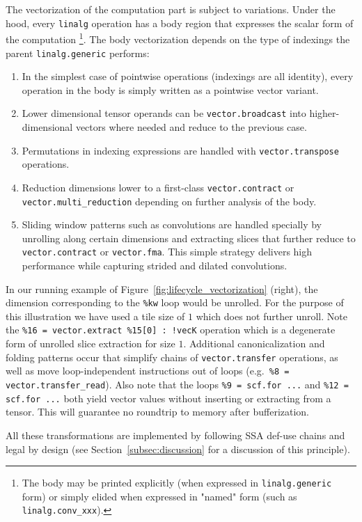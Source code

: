 The vectorization of the computation part is subject to variations.
Under the hood, every \lstinline|linalg| operation has a body region that expresses the scalar form of
the computation \footnote{The body may be printed explicitly (when expressed in \lstinline|linalg.generic| form)
or simply elided when expressed in "named" form (such as \lstinline|linalg.conv_xxx|).}.
The body vectorization depends on the type of indexings the parent \lstinline|linalg.generic| performs:
\begin{enumerate}
\item In the simplest case of pointwise operations (indexings are all identity), every operation in the body is simply written as a pointwise vector variant.
\item Lower dimensional tensor operands can be \lstinline|vector.broadcast| into higher-dimensional vectors where needed and reduce to the previous case.
\item Permutations in indexing expressions are handled with \lstinline|vector.transpose| operations.
\item Reduction dimensions lower to a first-class \lstinline{vector.contract} or \lstinline{vector.multi_reduction} depending on further analysis of the body.
\item Sliding window patterns such as convolutions are handled specially by unrolling along 
certain dimensions and extracting slices that further reduce to \lstinline{vector.contract} or
\lstinline{vector.fma}. This simple strategy delivers high performance
while capturing strided and dilated convolutions.
\end{enumerate}

In our running example of Figure~\ref{fig:lifecycle_vectorization} (right), the dimension corresponding to the \lstinline|%kw| loop would be unrolled. For the purpose of this illustration we have used a 
tile size of $1$ which does not further unroll. Note the 
\lstinline|%16 = vector.extract %15[0] : !vecK| operation which is a degenerate form of unrolled slice
extraction for size $1$.
Additional canonicalization and folding patterns occur that simplify chains of \lstinline|vector.transfer| operations, as well as move loop-independent instructions out of loops
(e.g.\ \lstinline|%8 = vector.transfer_read|).
Also note that the loops \lstinline|%9 = scf.for ...| and \lstinline|%12 = scf.for ...| both
yield vector values without inserting or extracting from a tensor.
This will guarantee no roundtrip to memory after bufferization.

All these transformations are implemented by following SSA def-use chains and legal by design (see Section~\ref{subsec:discussion} for a discussion of this principle).

